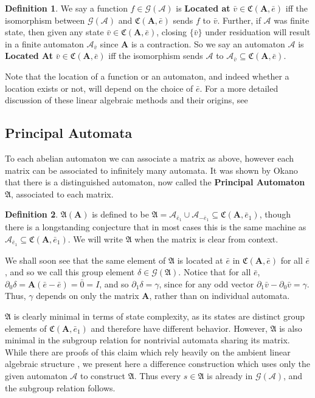 \documentclass{article}
\newcommand{\A}{\mathcal{A}}
\newcommand{\G}{\mathcal{G}}
\renewcommand{\P}{\mathfrak{A}}
\newcommand{\C}{\mathfrak{C}(\Am,\e)}
\newcommand{\2}{\textbf{2}}
\newcommand{\Am}{\textbf{A}}
\newcommand{\del}{\partial}
\newcommand{\vv}{\bar{v}}
\newcommand{\e}{\bar{e}}
\theoremstyle{definition}
\newtheorem{defn}{Definition}
\begin{document}
\begin{defn}
  We say a function $f \in \G(\A)$ is \textbf{Located at} $\vv \in \C$ iff 
  the isomorphism between $\G(\A)$ and $\C$ sends $f$ to $\vv$. Further, if
  $\A$ was finite state, then given any state $\vv \in \C$, closing 
  $\{ \vv \}$ under residuation will result in a finite automaton 
  $\A_{\vv}$ since $\Am$ is a contraction. So we say an automaton $\A$ is 
  \textbf{Located At} $\vv \in \C$ iff the isomorphism sends $\A$ to 
  $\A_{\vv} \subseteq \C$. 
\end{defn}

Note that the location of a function or an automaton, and indeed whether a 
location exists or not, will depend on the choice of $\e$. For a more detailed
discussion of these linear algebraic methods and their origins, see
\cite{Nekrashevych05:self_similar_groups,NekrashevychSidki04:automorphisms}

\subsection{Principal Automata}
To each abelian automaton we can associate a matrix as above, however each
matrix can be associated to infinitely many automata.
It was shown by Okano \cite{Okano15:thesis} that there is a 
distinguished automaton, now called the \textbf{Principal Automaton} $\P$, 
associated to each matrix. 

\begin{defn}
  $\P(\Am)$ is defined to be 
  $\P = \A_{\e_1} \cup \A_{-\e_1} \subseteq \mathfrak{C}(\Am, \e_1)$,
  though there is a longstanding conjecture that in most cases this is
  the same machine as $\A_{\e_1} \subseteq \mathfrak{C}(\Am, \e_1)$.
  We will write $\P$ when the matrix is clear from context. 
\end{defn}

We shall soon see that the same element of $\P$ is located at $\e$ in 
$\C$ for all $\e$, and so we call this group element $\delta \in \G(\P)$. 
Notice that for all $\e$, $\del_0 \delta = \Am(\e - \e) = \bar{0} = I$, and so
$\del_1 \delta = \gamma$, since for any odd vector 
$\del_1 \vv - \del_0 \vv = \gamma$. Thus, $\gamma$ depends on only the 
matrix $\Am$, rather than on individual automata.

$\P$ is clearly minimal in terms of state complexity, as its states are
distinct group elements of $\mathfrak{C}(\Am, \e_1)$ and therefore 
have different behavior. However, $\P$ is also minimal in the
subgroup relation for nontrivial automata sharing its matrix. 
While there are proofs of this claim which rely heavily on the
ambient linear algebraic structure \cite{Okano15:thesis}, 
we present here a difference construction which uses only the given 
automaton $\A$ to construct $\P$. Thus every $s \in \P$ is already in
$\G(\A)$, and the subgroup relation follows.
\end{document}
